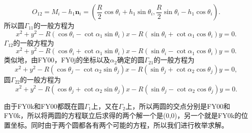 \documentclass[UTF-8,a4paper,zihao=-4]{ctexart}
\begin{document}
\begin{equation}
O_{12}
=
M_i-h_1\boldsymbol n_i
=
\left(
\frac{R}{2}\cos\theta_i+h_1\sin\theta_i,
\frac{R}{2}\sin\theta_i-h_1\cos\theta_i
\right).
\end{equation}
所以圆$\Gamma_{11}$的一般方程为
\begin{equation}
x^2+y^2
-
R\left(
\cos\theta_i-\cot\alpha_1\sin\theta_i
\right)x
-
R\left(
\sin\theta_i+\cot\alpha_1\cos\theta_i
\right)y
=0.
\end{equation}
$\Gamma_{12}$的一般方程为
\begin{equation}
x^2+y^2
-
R\left(
\cos\theta_i+\cot\alpha_1\sin\theta_i
\right)x
-
R\left(
\sin\theta_i-\cot\alpha_1\cos\theta_i
\right)y
=0.
\end{equation}
类似地，由FY00，FY0j的坐标以及$\alpha_2$确定的圆$\Gamma_{21}$的一般方程为
\begin{equation}
x^2+y^2
-
R\left(
\cos\theta_j-\cot\alpha_2\sin\theta_j
\right)x
-
R\left(
\sin\theta_j+\cot\alpha_2\cos\theta_j
\right)y
=0,
\end{equation}
圆$\Gamma_{22}$的一般方程为
\begin{equation}
x^2+y^2
-
R\left(
\cos\theta_j+\cot\alpha_2\sin\theta_j
\right)x
-
R\left(
\sin\theta_j-\cot\alpha_2\cos\theta_j
\right)y
=0.
\end{equation}

由于FY0k和FY00都既在圆$\Gamma_1$上，又在$\Gamma_2$上，所以两圆的交点分别是FY00和FY0k，所以将两圆的方程联立后求得的两个解一个是(0,0)，另一个就是FY0k的位置坐标。同时由于两个圆都各有两个可能的方程，所以我们进行枚举求解。
\end{document}
